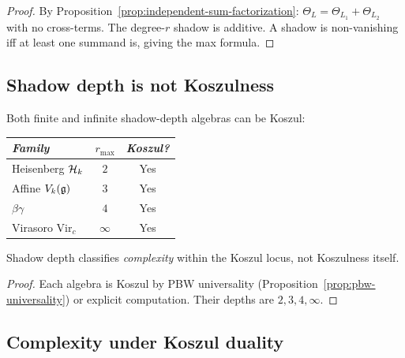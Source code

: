 \begin{proof}
By Proposition~\ref{prop:independent-sum-factorization}:
$\Theta_L = \Theta_{L_1} + \Theta_{L_2}$ with no cross-terms.
The degree-$r$ shadow is additive. A shadow is non-vanishing
iff at least one summand is, giving the max formula.
\end{proof}



\subsection{Shadow depth is not Koszulness}
\label{subsec:thqg-depth-vs-koszulness}

\begin{proposition}
\label{prop:thqg-depth-koszulness-independent}
\ClaimStatusProvedHere
{}
Both finite and infinite shadow-depth algebras can be Koszul:
\begin{center}
\small
\renewcommand{\arraystretch}{1.15}
\begin{tabular}{lcc}
\toprule
\emph{Family} & $r_{\max}$ & \emph{Koszul?} \\
\midrule
Heisenberg $\mathcal{H}_k$ & $2$ & Yes \\
Affine $V_k(\mathfrak{g})$ & $3$ & Yes \\
$\beta\gamma$ & $4$ & Yes \\
Virasoro $\mathrm{Vir}_c$ & $\infty$ & Yes \\
\bottomrule
\end{tabular}
\end{center}
Shadow depth classifies \emph{complexity} within the Koszul
locus, not Koszulness itself.
\end{proposition}

\begin{proof}
Each algebra is Koszul by PBW universality
(Proposition~\ref{prop:pbw-universality}) or explicit
computation. Their depths are $2, 3, 4, \infty$.
\end{proof}



\subsection{Complexity under Koszul duality}
\label{subsec:thqg-complexity-duality}

